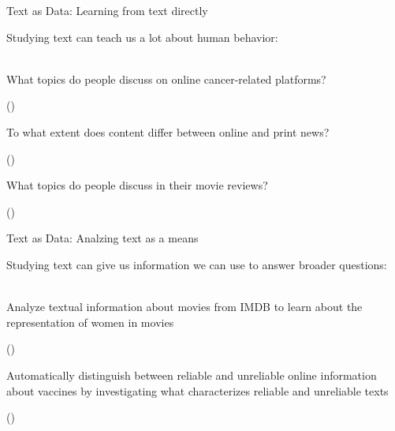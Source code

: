 \documentclass[handout]{beamer}
\begin{document}
\begin{frame}{Text as Data: \small{Learning from text directly}}
	
	Studying text can teach us a lot about human behavior: \\~
	
	What topics do people discuss on online cancer-related platforms? \\
	\begin{tiny}
		(\cite{sanders_different_2020}) \\
	\end{tiny}

	To what extent does content differ between online and print news? \\
	\begin{tiny}
	(\cite{burggraaff_through_2020}) \\
	\end{tiny}

	What topics do people discuss in their movie reviews? \\
	\begin{tiny}
	(\cite{schneider_what_2020}) \\
	\end{tiny}	

	
\end{frame}


\begin{frame}{Text as Data: \small{Analzing text as a means}}
	
	Studying text can give us information we can use to answer broader questions: \\~
	
	Analyze textual information about movies from IMDB to learn about the representation of women in movies \\
	\begin{tiny}
	(\cite{poma-murialdo_gender_2019}) \\
	\end{tiny}

	Automatically distinguish between reliable and unreliable online information about vaccines by investigating what characterizes reliable and unreliable texts \\
	\begin{tiny}
	(\cite{meppelink_reliable_2021}) \\
	\end{tiny}	
	
	
\end{frame}
\end{document}

